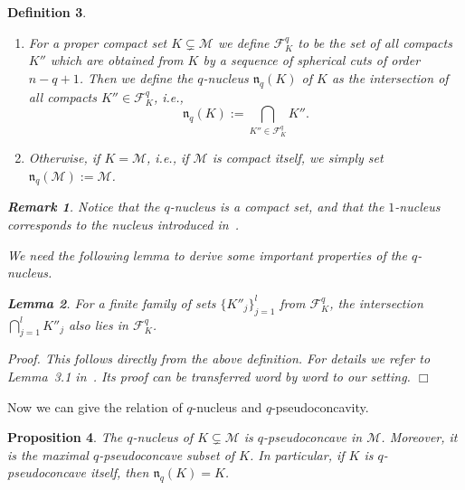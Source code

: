 \documentclass[11pt,a4paper]{article}
\newtheorem{lem}{Lemma}[section]
\newtheorem{prop}[lem]{Proposition}
\newtheorem{rem}[lem]{Remark}
\newtheorem{defn}[lem]{Definition}
\newenvironment{proof}{\noindent\textit{Proof. }}{\hfill $\Box$\linebreak}
\newcommand{\D}{\displaystyle}
\newcommand{\Fcal}{\mathcal{F}}
\newcommand{\Mcal}{\mathcal{M}}
\newcommand{\nuc}{\mathfrak{n}}
\begin{document}
\begin{defn}
\begin{enumerate}
\begin{itemize}
\item $K_1=K'$ and $K''=K_m$,

\item and $K_{j+1}$ is obtained from $K_j$ by a spherical cut of order $k$ for each $j=1,\ldots,m-1$.

\end{itemize}

\item For a proper compact set $K \subsetneq \Mcal$ we define $\Fcal_K^q$ to be the set of all compacts $K''$ which are obtained from $K$ by a sequence of spherical cuts of order $n-q+1$. Then we define the \emph{$q$-nucleus $\nuc_q(K)$ of $K$} as the intersection of all compacts $K'' \in \Fcal_K^q$, i.e.,
\[
\nuc_q(K) := \bigcap_{K'' \in \Fcal_K^q} K''.
\]
\item Otherwise, if $K=\Mcal$, i.e., if $\Mcal$ is compact itself, we simply set $\nuc_q(\Mcal) :=\Mcal$.

\end{enumerate}

\begin{rem}\label{q-nucleus-compact} Notice that the $q$-nucleus is a compact set, and that the $1$-nucleus corresponds to the \emph{nucleus} introduced in~\cite{Shc21}.
\end{rem}

We need the following lemma to derive some important properties of the $q$-nucleus.

\begin{lem} For a finite family of sets $\{K''_j\}_{j=1}^l$ from $\Fcal^q_K$, the intersection $\D \bigcap_{j=1}^l K''_j$ also lies in $\Fcal^q_K$. 
\end{lem}

\begin{proof} This follows directly from the above definition. For details we refer to Lemma~3.1 in~\cite{Shc21}. Its proof can be transferred word by word to our setting.
\end{proof}

\end{defn}

Now we can give the relation of $q$-nucleus and $q$-pseudoconcavity.

\begin{prop}\label{prop-qnuc-qpsc} The $q$-nucleus of $K \subsetneq \Mcal$ is $q$-pseudoconcave in $\Mcal$. Moreover, it is the maximal $q$-pseudoconcave subset of $K$. In particular, if $K$ is $q$-pseudoconcave itself, then $\nuc_q(K)=K$. 
\end{prop}
\end{document}
